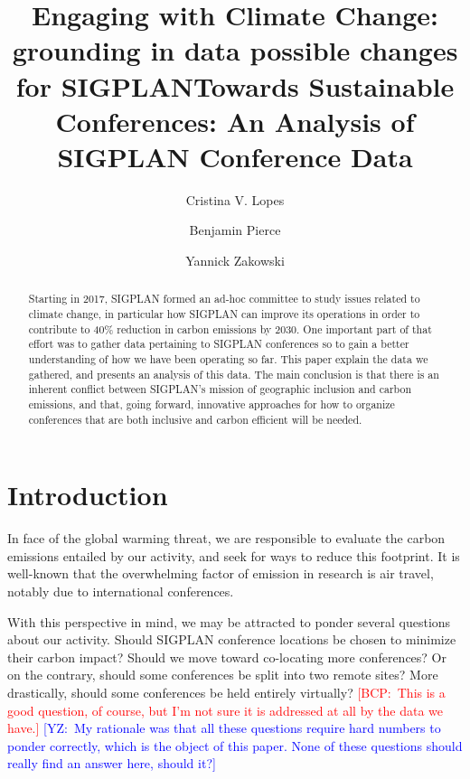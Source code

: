 \documentclass[manuscript, review, screen]{acmart}
\title{Engaging with Climate Change: grounding in data possible changes for SIGPLAN}
\newcommand{\yz}[1]{\textcolor{blue}{{[YZ:~#1]}}}
\newcommand{\bcp}[1]{\textcolor{red}{{[BCP:~#1]}}}
\newcommand{\yz}[1]{}
\newcommand{\bcp}[1]{}
\begin{document}
\title{Towards Sustainable Conferences: An Analysis of SIGPLAN Conference Data}

\author{Cristina V. Lopes}

\author{Benjamin Pierce}

\author{Yannick Zakowski}

\begin{abstract}
Starting in 2017, SIGPLAN formed an ad-hoc committee to study issues related to climate change, in particular how SIGPLAN can improve its operations in order to contribute to 40\% reduction in carbon emissions by 2030. One important part of that effort was to gather data pertaining to SIGPLAN conferences so to gain a better understanding of how we have been operating so far. This paper explain the data we gathered, and presents an analysis of this data. The main conclusion is that there is an inherent conflict between SIGPLAN's mission of geographic inclusion and carbon emissions, and that, going forward, innovative approaches for how to organize conferences that are both inclusive and carbon efficient will be needed. 
\end{abstract}


\maketitle

\section{Introduction}

In face of the global warming threat, we are responsible to evaluate the carbon
emissions entailed by our activity, and seek for ways to reduce this footprint.
It is well-known that the overwhelming factor of emission in research is air travel,
notably due to international conferences.

With this perspective in mind, we may be attracted to ponder several questions
about our activity. Should SIGPLAN conference locations be chosen to minimize
their carbon impact? Should we move toward co-locating more conferences? Or on
the contrary, should some conferences be split into two remote sites?
More drastically, should some conferences be held entirely virtually?
\bcp{This is a
  good question, of course, but I'm not sure it is addressed at all by the
  data we have.}
\yz{My rationale was that all these questions require hard numbers to ponder
  correctly, which is the object of this paper. None of these questions should
  really find an answer here, should it?}
\end{document}
